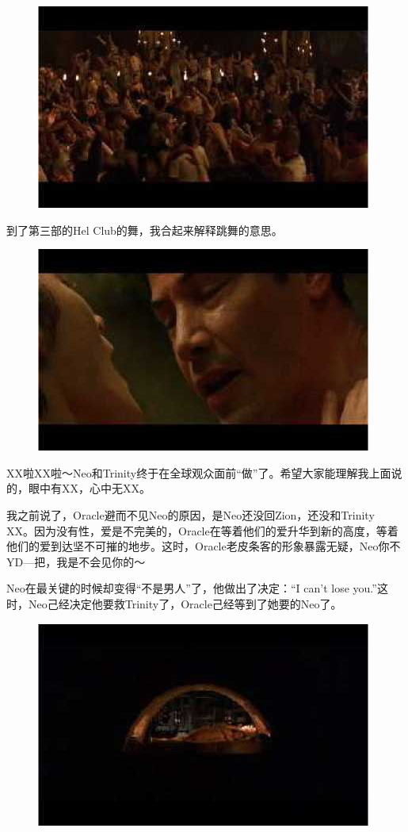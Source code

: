 \documentclass{ctexart}
\begin{document}
\begin{figure}[htb]
\centering
\includegraphics[width=0.5\linewidth]{fig/read_reloaded-43}
\end{figure}

到了第三部的Hel Club的舞，我合起来解释跳舞的意思。

\begin{figure}[htb]
\centering
\includegraphics[width=0.5\linewidth]{fig/read_reloaded-44}
\end{figure}

XX啦XX啦～Neo和Trinity终于在全球观众面前“做”了。希望大家能理解我上面说的，眼中有XX，心中无XX。

我之前说了，Oracle避而不见Neo的原因，是Neo还没回Zion，还没和Trinity XX。因为没有性，爱是不完美的，Oracle在等着他们的爱升华到新的高度，等着他们的爱到达坚不可摧的地步。这时，Oracle老皮条客的形象暴露无疑，Neo你不YD—把，我是不会见你的～

Neo在最关键的时候却变得“不是男人”了，他做出了决定：“I can't lose you.”这时，Neo己经决定他要救Trinity了，Oracle己经等到了她要的Neo了。

\begin{figure}[htb]
\centering
\includegraphics[width=0.5\linewidth]{fig/read_reloaded-46}
\end{figure}
\end{document}
